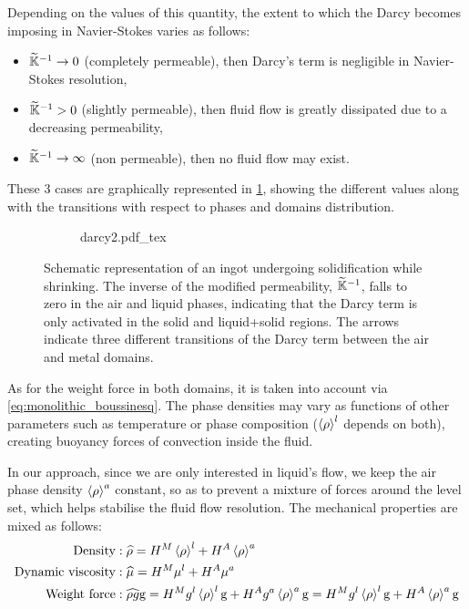 Depending on the values of this quantity, the extent to which the Darcy becomes imposing in Navier-Stokes varies as follows:
\begin{itemize}
\itemsep0em
\item $\widetilde{\mathbb{K}}^{-1} \rightarrow 0$ (completely permeable), then Darcy's term is negligible in Navier-Stokes resolution,
\item $\widetilde{\mathbb{K}}^{-1} > 0$ (slightly permeable), then fluid flow is greatly dissipated due to a decreasing permeability,
\item $\widetilde{\mathbb{K}}^{-1} \rightarrow \infty$ (non permeable), then no fluid flow may exist.
\end{itemize}
These 3 cases are graphically represented in \cref{fig:darcy_modif}, showing the different values along with the transitions 
with respect to phases and domains distribution. 

\begin{figure}[htbp]
\centering
  \begin{subfigure}{1.0\textwidth}
    \centering
    \def\svgwidth{250pt}
	{darcy2.pdf_tex}
  \end{subfigure}
\caption{Schematic representation of an ingot undergoing solidification while shrinking. 
The inverse of the modified permeability, $\widetilde{\mathbb{K}}^{-1}$, falls to zero in the air and liquid phases,
indicating that the Darcy term is only activated in the solid and liquid+solid regions.
The arrows indicate three different transitions of the Darcy term between the air and metal domains.}
\label{fig:darcy_modif}
\end{figure}

As for the weight force in both domains, it is taken into account via \cref{eq:monolithic_boussinesq}. 
The phase densities may vary as functions of other parameters such
as temperature or phase composition ($\left \langle \rho \right \rangle^l$ depends on both), creating buoyancy forces of convection inside the fluid.

In our approach, since we are only interested in liquid's flow, we keep the air phase density $\left \langle \rho \right \rangle^a$ constant,
so as to prevent a mixture of forces around the level set, which helps stabilise the fluid flow resolution.
The mechanical properties are mixed as follows:
\begin{align}
%
\label{eq:monolithic_density}
\text{Density}&: \mix{\rho} = \heavisideM \rhol + \heavisideA \rhoa \\
%
\label{eq:monolithic_viscosity}
\text{Dynamic viscosity}&: \mix{\mu} = \heavisideM \mul + \heavisideA \mua \\
%
\label{eq:monolithic_boussinesq}
\text{Weight force}&: \mix{\rho g} \gravity 	=  \heavisideM \gl \rhol \gravity + \heavisideA \ga \rhoa \gravity
												=  \heavisideM \gl \rhol \gravity + \heavisideA \rhoa \gravity
%
\end{align}

